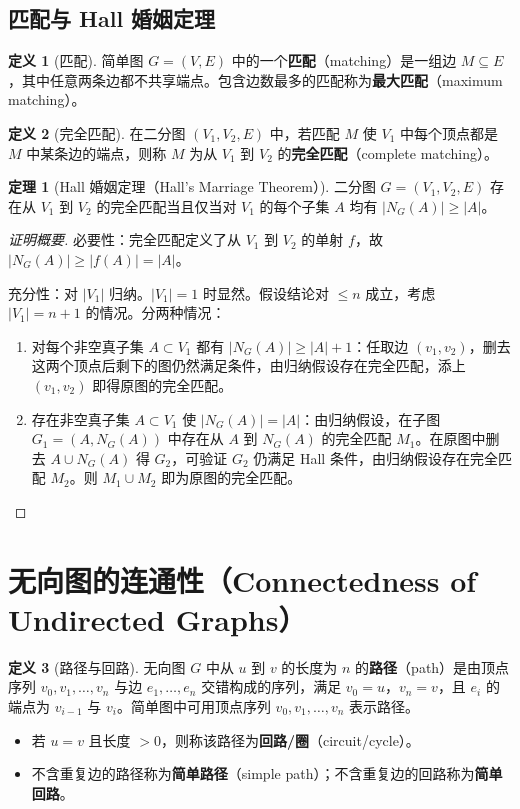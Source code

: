 \documentclass[UTF8,11pt,a4paper]{ctexbook}   %
\theoremstyle{definition}
\newtheorem{definition}{定义}[section]
\newtheorem{theorem}{定理}[section]
\begin{document}
\subsection{匹配与 Hall 婚姻定理}

\begin{definition}[匹配]
简单图 $G=(V,E)$ 中的一个\textbf{匹配}（matching）是一组边 $M \subseteq E$，其中任意两条边都不共享端点。包含边数最多的匹配称为\textbf{最大匹配}（maximum matching）。
\end{definition}

\begin{definition}[完全匹配]
在二分图 $(V_1,V_2,E)$ 中，若匹配 $M$ 使 $V_1$ 中每个顶点都是 $M$ 中某条边的端点，则称 $M$ 为从 $V_1$ 到 $V_2$ 的\textbf{完全匹配}（complete matching）。
\end{definition}

\begin{theorem}[Hall 婚姻定理（Hall's Marriage Theorem）]
二分图 $G=(V_1,V_2,E)$ 存在从 $V_1$ 到 $V_2$ 的完全匹配当且仅当对 $V_1$ 的每个子集 $A$ 均有 $|N_G(A)| \geq |A|$。
\end{theorem}

\begin{proof}[证明概要]
必要性：完全匹配定义了从 $V_1$ 到 $V_2$ 的单射 $f$，故 $|N_G(A)| \geq |f(A)| = |A|$。

充分性：对 $|V_1|$ 归纳。$|V_1|=1$ 时显然。假设结论对 $\leq n$ 成立，考虑 $|V_1|=n+1$ 的情况。分两种情况：
\begin{enumerate}
    \item 对每个非空真子集 $A \subset V_1$ 都有 $|N_G(A)| \geq |A|+1$：任取边 $(v_1,v_2)$，删去这两个顶点后剩下的图仍然满足条件，由归纳假设存在完全匹配，添上 $(v_1,v_2)$ 即得原图的完全匹配。
    \item 存在非空真子集 $A \subset V_1$ 使 $|N_G(A)| = |A|$：由归纳假设，在子图 $G_1 = (A, N_G(A))$ 中存在从 $A$ 到 $N_G(A)$ 的完全匹配 $M_1$。在原图中删去 $A \cup N_G(A)$ 得 $G_2$，可验证 $G_2$ 仍满足 Hall 条件，由归纳假设存在完全匹配 $M_2$。则 $M_1 \cup M_2$ 即为原图的完全匹配。
\end{enumerate}
\end{proof}

\section{无向图的连通性（Connectedness of Undirected Graphs）}

\begin{definition}[路径与回路]
无向图 $G$ 中从 $u$ 到 $v$ 的长度为 $n$ 的\textbf{路径}（path）是由顶点序列 $v_0,v_1,\dots,v_n$ 与边 $e_1,\dots,e_n$ 交错构成的序列，满足 $v_0=u$，$v_n=v$，且 $e_i$ 的端点为 $v_{i-1}$ 与 $v_i$。简单图中可用顶点序列 $v_0,v_1,\dots,v_n$ 表示路径。
\begin{itemize}
    \item 若 $u=v$ 且长度 $>0$，则称该路径为\textbf{回路/圈}（circuit/cycle）。
    \item 不含重复边的路径称为\textbf{简单路径}（simple path）；不含重复边的回路称为\textbf{简单回路}。
\end{itemize}
\end{definition}
\end{document}
